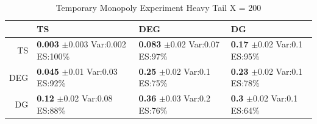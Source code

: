 \documentclass[11pt,letterpaper]{article}
\begin{document}
\begin{table}[H]
\centering
\caption{Temporary Monopoly Experiment Heavy Tail X = 200} 
\begin{tabular}{rlll}
  \hline
 & TS & DEG &  DG \\ 
  \hline
TS & \makecell{\textbf{0.003} $\pm$0.003\\Var:0.002\\ES:100\%} & \makecell{\textbf{0.083} $\pm$0.02\\Var:0.07\\ES:97\%} & \makecell{\textbf{0.17} $\pm$0.02\\Var:0.1\\ES:95\%} \\ 
  DEG & \makecell{\textbf{0.045} $\pm$0.01\\Var:0.03\\ES:92\%} & \makecell{\textbf{0.25} $\pm$0.02\\Var:0.1\\ES:75\%} & \makecell{\textbf{0.23} $\pm$0.02\\Var:0.1\\ES:78\%} \\ 
   DG & \makecell{\textbf{0.12} $\pm$0.02\\Var:0.08\\ES:88\%} & \makecell{\textbf{0.36} $\pm$0.03\\Var:0.2\\ES:76\%} & \makecell{\textbf{0.3} $\pm$0.02\\Var:0.1\\ES:64\%} \\ 
   \hline
\end{tabular}
\end{table}
\end{document}
